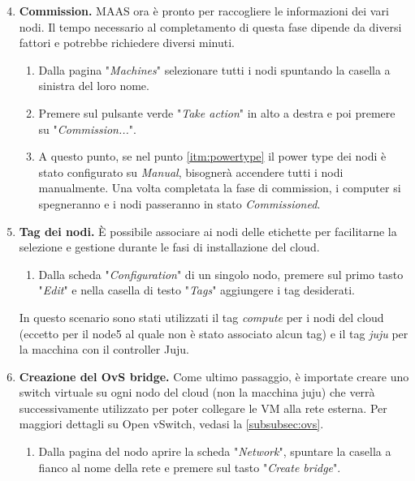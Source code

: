 \begin{enumerate}\setcounter{enumi}{3}
    \item \textbf{Commission.} MAAS ora è pronto per raccogliere le informazioni dei vari nodi.
    Il tempo necessario al completamento di questa fase dipende da diversi fattori e potrebbe richiedere diversi minuti.
    \begin{enumerate}
        \item Dalla  pagina "\emph{Machines}" selezionare tutti i nodi spuntando la casella a sinistra del loro nome.
        
        \item Premere sul pulsante verde "\emph{Take action}" in alto a destra e poi premere su "\emph{Commission...}". %
        
        \item A questo punto, se nel punto \ref{itm:powertype} il power type dei nodi è stato configurato su \emph{Manual}, bisognerà accendere tutti i nodi manualmente.
        Una volta completata la fase di commission, i computer si spegneranno e i nodi passeranno in stato \emph{Commissioned}.
    \end{enumerate}
    
    \item\label{itm:tag_node} \textbf{Tag dei nodi.} È possibile associare ai nodi delle etichette per facilitarne la selezione e gestione durante le fasi di installazione del cloud.
    \begin{enumerate}
        \item[] Dalla  scheda "\emph{Configuration}" di un singolo nodo, premere sul primo tasto "\emph{Edit}" e nella casella di testo "\emph{Tags}" aggiungere i tag desiderati. 
    \end{enumerate}
    In questo scenario sono stati utilizzati il tag \emph{compute} per i nodi del cloud (eccetto per il node5 al quale non è stato associato alcun tag) e il tag \emph{juju} per la macchina con il controller Juju. 

    \item\label{itm:maas_ovs_bridge} \textbf{Creazione del OvS bridge.} Come ultimo passaggio, è importate creare uno switch virtuale su ogni nodo del cloud (non la macchina juju) che verrà successivamente utilizzato per poter collegare le VM alla rete esterna.
    Per maggiori dettagli su Open vSwitch, vedasi la \cref{subsubsec:ovs}.
    \begin{enumerate}
        \item Dalla  pagina del nodo aprire la scheda "\emph{Network}", spuntare la casella a fianco al nome della rete e premere sul tasto "\emph{Create bridge}".


\end{enumerate}
\end{enumerate}
